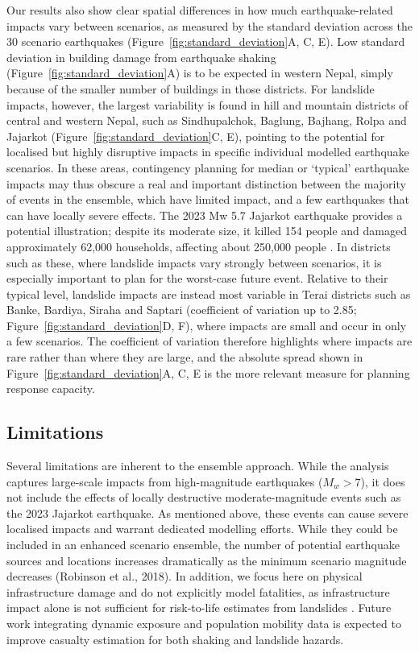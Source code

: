 \documentclass[preprint,12pt,authoryear]{elsarticle}
\begin{document}
Our results also show clear spatial differences in how much earthquake-related impacts vary between scenarios, as measured by the standard deviation across the 30 scenario earthquakes (Figure~\ref{fig:standard_deviation}A, C, E). Low standard deviation in building damage from earthquake shaking (Figure~\ref{fig:standard_deviation}A) is to be expected in western Nepal, simply because of the smaller number of buildings in those districts. For landslide impacts, however, the largest variability is found in hill and mountain districts of central and western Nepal, such as Sindhupalchok, Baglung, Bajhang, Rolpa and Jajarkot (Figure~\ref{fig:standard_deviation}C, E), pointing to the potential for localised but highly disruptive impacts in specific individual modelled earthquake scenarios. In these areas, contingency planning for median or `typical' earthquake impacts may thus obscure a real and important distinction between the majority of events in the ensemble, which have limited impact, and a few earthquakes that can have locally severe effects. The 2023 Mw 5.7 Jajarkot earthquake provides a potential illustration; despite its moderate size, it killed 154 people and damaged approximately 62,000 households, affecting about 250,000 people \citep{UNRCO2024}. In districts such as these, where landslide impacts vary strongly between scenarios, it is especially important to plan for the worst-case future event. Relative to their typical level, landslide impacts are instead most variable in Terai districts such as Banke, Bardiya, Siraha and Saptari (coefficient of variation up to 2.85; Figure~\ref{fig:standard_deviation}D, F), where impacts are small and occur in only a few scenarios. The coefficient of variation therefore highlights where impacts are rare rather than where they are large, and the absolute spread shown in Figure~\ref{fig:standard_deviation}A, C, E is the more relevant measure for planning response capacity.

\subsection{Limitations}

Several limitations are inherent to the ensemble approach. While the analysis captures large-scale impacts from high-magnitude earthquakes ($M_w > 7$), it does not include the effects of locally destructive moderate-magnitude events such as the 2023 Jajarkot earthquake. As mentioned above, these events can cause severe localised impacts and warrant dedicated modelling efforts. While they could be included in an enhanced scenario ensemble, the number of potential earthquake sources and locations increases dramatically as the minimum scenario magnitude decreases (Robinson et al., 2018). In addition, we focus here on physical infrastructure damage and do not explicitly model fatalities, as infrastructure impact alone is not sufficient for risk-to-life estimates from landslides \citep{VanWykDeVries2024}. Future work integrating dynamic exposure and population mobility data is expected to improve casualty estimation for both shaking and landslide hazards.
\end{document}
